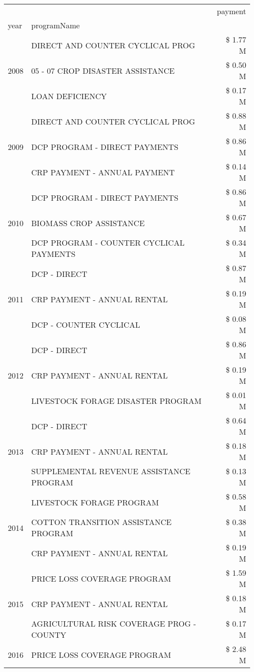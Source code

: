 \begin{tabular}{llr}
\toprule
 &  & payment \\
year & programName &  \\
\midrule
\multirow[t]{3}{*}{2008} & DIRECT AND COUNTER CYCLICAL PROG & \$ 1.77 M \\
 & 05 - 07 CROP DISASTER ASSISTANCE & \$ 0.50 M \\
 & LOAN DEFICIENCY & \$ 0.17 M \\
\cline{1-3}
\multirow[t]{3}{*}{2009} & DIRECT AND COUNTER CYCLICAL PROG & \$ 0.88 M \\
 & DCP PROGRAM - DIRECT PAYMENTS & \$ 0.86 M \\
 & CRP PAYMENT - ANNUAL PAYMENT & \$ 0.14 M \\
\cline{1-3}
\multirow[t]{3}{*}{2010} & DCP PROGRAM - DIRECT PAYMENTS & \$ 0.86 M \\
 & BIOMASS CROP ASSISTANCE & \$ 0.67 M \\
 & DCP PROGRAM - COUNTER CYCLICAL PAYMENTS & \$ 0.34 M \\
\cline{1-3}
\multirow[t]{3}{*}{2011} & DCP - DIRECT & \$ 0.87 M \\
 & CRP PAYMENT - ANNUAL RENTAL & \$ 0.19 M \\
 & DCP - COUNTER CYCLICAL & \$ 0.08 M \\
\cline{1-3}
\multirow[t]{3}{*}{2012} & DCP - DIRECT & \$ 0.86 M \\
 & CRP PAYMENT - ANNUAL RENTAL & \$ 0.19 M \\
 & LIVESTOCK FORAGE DISASTER PROGRAM & \$ 0.01 M \\
\cline{1-3}
\multirow[t]{3}{*}{2013} & DCP - DIRECT & \$ 0.64 M \\
 & CRP PAYMENT - ANNUAL RENTAL & \$ 0.18 M \\
 & SUPPLEMENTAL REVENUE ASSISTANCE PROGRAM & \$ 0.13 M \\
\cline{1-3}
\multirow[t]{3}{*}{2014} & LIVESTOCK FORAGE PROGRAM & \$ 0.58 M \\
 & COTTON TRANSITION ASSISTANCE PROGRAM & \$ 0.38 M \\
 & CRP PAYMENT - ANNUAL RENTAL & \$ 0.19 M \\
\cline{1-3}
\multirow[t]{3}{*}{2015} & PRICE LOSS COVERAGE PROGRAM & \$ 1.59 M \\
 & CRP PAYMENT - ANNUAL RENTAL & \$ 0.18 M \\
 & AGRICULTURAL RISK COVERAGE PROG - COUNTY & \$ 0.17 M \\
\cline{1-3}
\multirow[t]{3}{*}{2016} & PRICE LOSS COVERAGE PROGRAM                   & \$ 2.48 M \\

\end{tabular}
